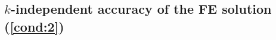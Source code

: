 











\subsection{$k$-independent accuracy of the FE solution (\cref{cond:2})}\label{sec:cond2}

